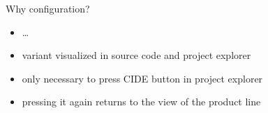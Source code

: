 \begin{frame}{\myframetitle}
	\begin{mycolumns}[widths={45},animation=none]
		\begin{example}{Why configuration?}
			\begin{itemize}
				\item \ldots
				\item variant visualized in source code and project explorer
				\item only necessary to press CIDE button in project explorer
				\item pressing it again returns to the view of the product line
			\end{itemize}
		\end{example}
	\mynextcolumn
	\end{mycolumns}
\end{frame}
